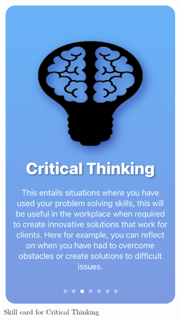 \documentclass{l4proj}
\begin{document}
\begin{appendices}
\begin{figure}[H]
\begin{subfigure}[b]{0.3\textwidth}
        \includegraphics[scale=0.25]{images/CriticalThinkingCard.pdf}
        \caption{Skill card for Critical Thinking}
        \label{fig:CriticalThinkingCard}
    \end{subfigure}
    \begin{subfigure}[b]{0.3\textwidth}

\end{subfigure}
\end{figure}
\end{appendices}
\end{document}
